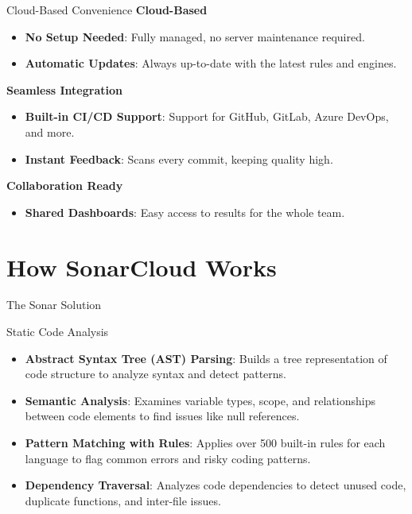 \documentclass{beamer}
\begin{document}
\begin{frame}{Cloud-Based Convenience}
  \textbf{Cloud-Based}
  \begin{itemize}
      \item \textbf{No Setup Needed}: Fully managed, no server maintenance required.
      \item \textbf{Automatic Updates}: Always up-to-date with the latest rules and engines.
  \end{itemize}
  
  \textbf{Seamless Integration}
  \begin{itemize}
      \item \textbf{Built-in CI/CD Support}: Support for GitHub, GitLab, Azure DevOps, and more.
      \item \textbf{Instant Feedback}: Scans every commit, keeping quality high.
  \end{itemize}
  
  \textbf{Collaboration Ready}
  \begin{itemize}
      \item \textbf{Shared Dashboards}: Easy access to results for the whole team.
  \end{itemize}
\end{frame}


\section[How SonarCloud Works]{How SonarCloud Works}

\begin{frame}{The Sonar Solution}
\end{frame}


\begin{frame}{Static Code Analysis}
  \begin{itemize}
    \item \textbf{Abstract Syntax Tree (AST) Parsing}: Builds a tree representation of code structure to analyze syntax and detect patterns.
    \item \textbf{Semantic Analysis}: Examines variable types, scope, and relationships between code elements to find issues like null references.
    \item \textbf{Pattern Matching with Rules}: Applies over 500 built-in rules for each language to flag common errors and risky coding patterns.
    \item \textbf{Dependency Traversal}: Analyzes code dependencies to detect unused code, duplicate functions, and inter-file issues.
\end{itemize}
\end{frame}
\end{document}
